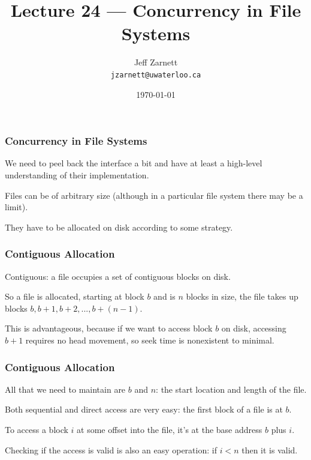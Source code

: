

\title{Lecture 24 --- Concurrency in File Systems }

\author{Jeff Zarnett \\ \small \texttt{jzarnett@uwaterloo.ca}}
\date{\today}




\begin{frame}
	\titlepage

\end{frame}


\begin{frame}
	\frametitle{Concurrency in File Systems}

	We need to peel back the interface a bit and have at least a high-level understanding of their implementation.

	Files can be of arbitrary size (although in a particular file system there may be a limit).

	They have to be allocated on disk according to some strategy.

\end{frame}

\begin{frame}
	\frametitle{Contiguous Allocation}
	Contiguous: a file occupies a set of contiguous blocks on disk.

	So a file is allocated, starting at block $b$ and is $n$ blocks in size, the file takes up blocks $b, b+1, b+2, ..., b+(n-1)$.

	This is advantageous, because if we want to access block $b$ on disk, accessing $b+1$ requires no head movement, so seek time is nonexistent to minimal.

\end{frame}

\begin{frame}
	\frametitle{Contiguous Allocation}

	All that we need to maintain are $b$ and $n$: the start location and length of the file.

	Both sequential and direct access are very easy: the first block of a file is at $b$.

	To access a block $i$ at some offset into the file, it's at the base address $b$ plus $i$.

	Checking if the access is valid is also an easy operation: if $i < n$ then it is valid.

\end{frame}

